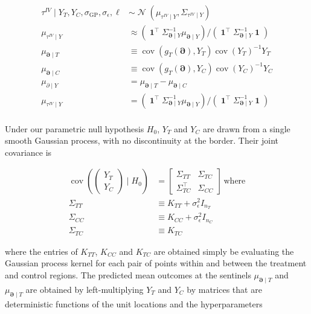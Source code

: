 \documentclass[letter]{article}
\newcommand{\genericdel}[3]{%
      \left#1#3\right#2
    }
\newcommand{\del}[1]{\genericdel(){#1}}
\DeclareMathOperator{\cov}{{cov}}
\DeclareMathOperator{\normal}{\mathcal{N}}
\DeclareMathOperator{\ones}{\mathbf{1}}
\newcommand{\trans}{^{\intercal}}
\newcommand{\sigmaf}{\sigma_{\mathrm{GP}}}
\newcommand{\sigman}{\sigma_{\epsilon}}
\newcommand{\boundary}{\partial}
\newcommand{\sentinels}{\bm{\boundary}}
\newcommand{\invvar}{\tau^{IV}}
\begin{document}
\begin{equation}\begin{split}
    \invvar \mid Y_T, Y_C, \sigmaf, \sigman, \ell &\sim \normal\del{\mu_{\invvar \mid Y}, \Sigma_{\invvar \mid Y}} \\
    \mu_{\invvar \mid Y} &\approx \del{\ones\trans \Sigma_{\sentinels \mid Y}^{-1} \mu_{\sentinels \mid Y}} \big/ \del{\ones\trans \Sigma_{\sentinels \mid Y}^{-1} \ones}  \\
    \mu_{\sentinels \mid T} &\equiv \cov\del{g_T(\sentinels), Y_T} \cov\del{Y_T}^{-1}  Y_T \\
    \mu_{\sentinels \mid C} &\equiv \cov\del{g_T(\sentinels), Y_C} \cov\del{Y_C}^{-1}  Y_C \\
    \mu_{\boundary \mid Y} &=  \mu_{\sentinels \mid T} - \mu_{\sentinels \mid C} \\
    \mu_{\invvar \mid Y} &= \del{\ones\trans \Sigma_{\sentinels \mid Y}^{-1} \mu_{\sentinels \mid Y}} \big/ \del{\ones\trans \Sigma_{\sentinels \mid Y}^{-1} \ones}  \\
\end{split}\end{equation}
    


    	Under our parametric null hypothesis \(H_0\), \(Y_T\) and \(Y_C\) are
drawn from a single smooth Gaussian process, with no discontinuity at
the border. Their joint covariance is

\begin{equation}
\begin{aligned}
    \cov \del{\begin{pmatrix}Y_T \\ Y_C\end{pmatrix} \mid H_0 } &= \begin{bmatrix}
                        \Sigma_{TT} & \Sigma_{TC} \\
                        \Sigma\trans_{TC} & \Sigma_{CC}
                    \end{bmatrix}\,\text{where} \\
    \Sigma_{TT} &\equiv K_{TT} + \sigman^2 I_{n_T} \\
    \Sigma_{CC} &\equiv K_{CC} + \sigman^2 I_{n_C} \\
    \Sigma_{TC} &\equiv K_{TC}
\end{aligned}
\end{equation}

where the entries of \(K_{TT}\), \(K_{CC}\) and \(K_{TC}\) are obtained
simply be evaluating the Gaussian process kernel for each pair of points
within and between the treatment and control regions. The predicted mean
outcomes at the sentinels \(\mu_{\sentinels \mid T}\) and
\(\mu_{\sentinels \mid T}\) are obtained by left-multiplying \(Y_T\) and
\(Y_C\) by matrices that are deterministic functions of the unit
locations and the hyperparameters
\end{document}
